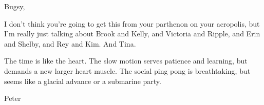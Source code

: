 

Bugsy,

I don't think you're going to get this from your parthenon on your
acropolis, but I'm really just talking about Brook and Kelly, and
Victoria and Ripple, and Erin and Shelby, and Rey and Kim.  And Tina.

The time is like the heart.  The slow motion serves patience and
learning, but demands a new larger heart muscle.  The social ping pong
is breathtaking, but seems like a glacial advance or a submarine
party.

Peter


\bye
